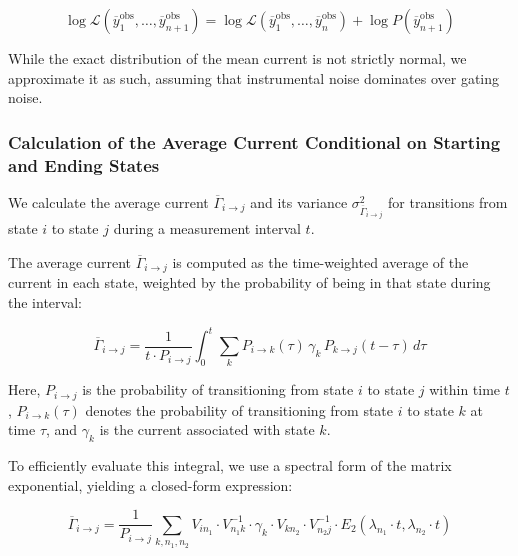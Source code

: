 \documentclass[pdflatex,sn-mathphys-num]{sn-jnl}%
\theoremstyle{thmstyleone}%
\theoremstyle{thmstyletwo}%
\theoremstyle{thmstylethree}%
\begin{document}
\begin{equation}
	\log \mathcal{L}(\overline{y}_1^{\text{obs}}, \dots, \overline{y}_{n+1}^{\text{obs}}) = \log \mathcal{L}(\overline{y}_1^{\text{obs}}, \dots, \overline{y}_n^{\text{obs}}) + \log P(\overline{y}_{n+1}^{\text{obs}})
	\label{eq:single_channel_integrated_total_likelihood}
\end{equation}

While the exact distribution of the mean current is not strictly normal, we approximate it as such, assuming that instrumental noise dominates over gating noise.

\subsubsection{Calculation of the Average Current Conditional on Starting and Ending States}

We calculate the average current \( \overline{\Gamma}_{i \rightarrow j} \) and its variance \( \sigma^2_{\overline{\Gamma}_{i \rightarrow j}} \) for transitions from state \( i \) to state \( j \) during a measurement interval \( t \).

The average current \( \overline{\Gamma}_{i \rightarrow j} \) is computed as the time-weighted average of the current in each state, weighted by the probability of being in that state during the interval:

\begin{equation}
	\overline{\Gamma}_{i \rightarrow j} = \frac{1}{t \cdot P_{i \rightarrow j}} \int_0^t \sum_k P_{i \rightarrow k}(\tau) \, \gamma_k \, P_{k \rightarrow j}(t - \tau) \, d\tau
	\label{eq:gamma_ij_integral}
\end{equation}

Here, \( P_{i \rightarrow j} \) is the probability of transitioning from state \( i \) to state \( j \) within time \( t \), \( P_{i \rightarrow k}(\tau) \) denotes the probability of transitioning from state \( i \) to state \( k \) at time \( \tau \), and \( \gamma_k \) is the current associated with state \( k \).

To efficiently evaluate this integral, we use a spectral form of the matrix exponential, yielding a closed-form expression:

\begin{equation}
	\overline{\Gamma}_{i \rightarrow j} = \frac{1}{P_{i \rightarrow j}} \sum_{k, n_1, n_2} V_{i n_1} \cdot V^{-1}_{n_1 k} \cdot \gamma_k \cdot V_{k n_2} \cdot V^{-1}_{n_2 j} \cdot E_2(\lambda_{n_1} \cdot t, \lambda_{n_2} \cdot t)
	\label{eq:gamma_ij_formula}
\end{equation}
\end{document}

